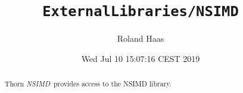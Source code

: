 \documentclass{article}
\begin{document}
\title{\tt ExternalLibraries/NSIMD}
\author{Roland Haas}
\date{ Wed Jul 10 15:07:16 CEST 2019 }

\maketitle


\ifx\ThisThorn\undefined
\newcommand{\ThisThorn}{{\it NSIMD}}
\else
\renewcommand{\ThisThorn}{{\it NSIMD}}
\fi

\begin{abstract}
Thorn \ThisThorn\ provides access to the NSIMD library.
\end{abstract}

\end{document}
